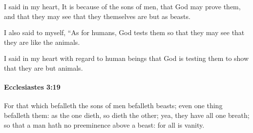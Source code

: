 			\begin{versebox}
					\item[BHS] 
					\item[LXX] 
					\item[ASV] I said in my heart, It is because of the sons of men, that God may prove them, and that they may see that they themselves are but as beasts.
					\item[NIV] I also said to myself, “As for humans, God tests them so that they may see that they are like the animals.
					\item[NRSV] I said in my heart with regard to human beings that God is testing them to show that they are but animals.
			\end{versebox}

		\paragraph{Ecclesiastes 3:19} %
			\label{ECCLESIASTES-3-19}

			For that which befalleth the sons of men befalleth beasts; even one thing befalleth them: as the one dieth, so dieth the other; yea, they have all one breath; so that a man hath no preeminence above a beast: for all is vanity.

